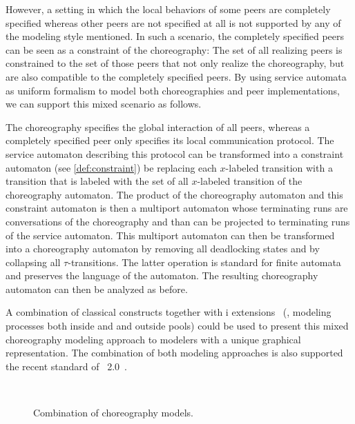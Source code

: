 However, a setting in which the local behaviors of some peers are completely specified whereas other peers are not specified at all is not supported by any of the  modeling style mentioned. In such a scenario, the completely specified peers can be seen as a constraint of the choreography: The set of all realizing peers is constrained to the set of those peers that not only realize the choreography, but are also compatible to the completely specified peers. By using service automata as uniform formalism to model both choreographies and peer implementations, we can support this mixed scenario as follows.

The choreography specifies the global interaction of all peers, whereas a completely specified peer only specifies its local communication protocol. The service automaton describing this protocol can be transformed into a constraint automaton (see \autoref{def:constraint}) be replacing each $x$-labeled transition with a transition that is labeled with the set of all $x$-labeled transition of the choreography automaton. The product of the choreography automaton and this constraint automaton is then a multiport automaton whose terminating runs are conversations of the choreography and than can be projected to terminating runs of the service automaton. This multiport automaton can then be transformed into a choreography automaton by removing all deadlocking states and by collapsing all $\tau$-transitions. The latter operation is standard for finite automata~\cite{HopcroftMU_1979} and preserves the language of the automaton. The resulting choreography automaton can then be analyzed as before.

A combination of classical  constructs together with i extensions~\cite{DeckerB_2007_bpmw} (\ie, modeling processes both inside and and outside pools) could be used to present this mixed choreography modeling approach to modelers with a unique graphical representation. The combination of both modeling approaches is also supported the recent standard of ~2.0~\cite{standard_bpmn2}.

\begin{figure}[t!]
\centering
{}
\\
\hfill
{}
\caption{Combination of choreography models.}\label{fig:realization:combination}
\end{figure}


